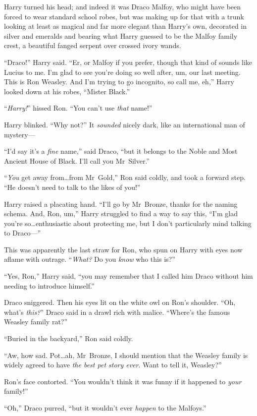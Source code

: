 Harry turned his head; and indeed it was Draco Malfoy, who might have been forced to wear standard school robes, but was making up for that with a trunk looking at least as magical and far more elegant than Harry’s own, decorated in silver and emeralds and bearing what Harry guessed to be the Malfoy family crest, a beautiful fanged serpent over crossed ivory wands.

“Draco!” Harry said. “Er, or Malfoy if you prefer, though that kind of sounds like Lucius to me. I’m glad to see you’re doing so well after, um, our last meeting. This is Ron Weasley. And I’m trying to go incognito, so call me, eh,” Harry looked down at his robes, “Mister Black.”

“\emph{Harry!}” hissed Ron. “You can’t use \emph{that} name!”

Harry blinked. “Why not?” It \emph{sounded} nicely dark, like an international man of mystery—

“I’d say it’s a \emph{fine} name,” said Draco, “but it belongs to the Noble and Most Ancient House of Black. I’ll call you Mr~Silver.”

“\emph{You} get away from…from Mr~Gold,” Ron said coldly, and took a forward step. “He doesn’t need to talk to the likes of you!”

Harry raised a placating hand. “I’ll go by Mr~Bronze, thanks for the naming schema. And, Ron, um,” Harry struggled to find a way to say this, “I’m glad you’re so…enthusiastic about protecting me, but I don’t particularly mind talking to Draco—”

This was apparently the last straw for Ron, who spun on Harry with eyes now aflame with outrage. “\emph{What?} Do you \emph{know} who this is?”

“Yes, Ron,” Harry said, “you may remember that I called him Draco without him needing to introduce himself.”

Draco sniggered. Then his eyes lit on the white owl on Ron’s shoulder. “Oh, what’s \emph{this?}” Draco said in a drawl rich with malice. “Where’s the famous Weasley family rat?”

“Buried in the backyard,” Ron said coldly.

“Aw, how sad. Pot…ah, Mr~Bronze, I should mention that the Weasley family is widely agreed to have \emph{the best pet story ever}. Want to tell it, Weasley?”

Ron’s face contorted. “You wouldn’t think it was funny if it happened to \emph{your} family!”

“Oh,” Draco purred, “but it wouldn’t ever \emph{happen} to the Malfoys.”

